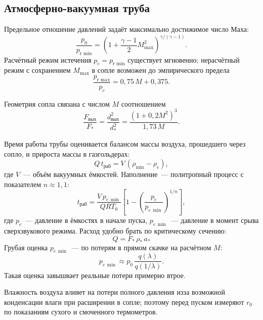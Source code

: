 \documentclass[12pt,a4paper]{article}
\begin{document}
\subsection{Атмосферно-вакуумная труба}

 Предельное отношение давлений задаёт
максимально достижимое число Маха:
\begin{equation}
    \frac{p_0}{p_{\text{г min}}}
    =
    \left(1 + \frac{\gamma-1}{2} M_{\max}^2\right)^{\gamma/(\gamma-1)}.
\end{equation}
Расчётный режим истечения $p_c = p_{\text{г min}}$ существует
мгновенно; нерасчётный режим с сохранением $M_{\max}$ в сопле возможен
до эмпирического предела
\begin{equation}
    \frac{p_{\text{г max}}}{p_c} = 0{,}75\,M + 0{,}375.
\end{equation}

Геометрия сопла связана с числом $M$ соотношением
\begin{equation}
    \frac{F_{\text{вых}}}{F_*}
    =
    \frac{d_{\text{вых}}^2}{d_*^2}
    =
    \frac{(1 + 0{,}2 M^2)^3}{1{,}73\,M}.
\end{equation}

Время работы трубы оценивается балансом массы воздуха, прошедшего через
сопло, и прироста массы в газгольдерах:
\begin{equation}
    Q\, t_{\text{раб}} = V\,(\rho_{\min} - \rho_e),
    \label{eq:mass}
\end{equation}
где $V$~--- объём вакуумных ёмкостей. Наполнение~--- политропный процесс
с показателем $n \approx 1{,}1$:
\begin{equation}
    t_{\text{раб}}
    =
    \frac{V\, p_{e\,\min}}{Q R T_0}
    \left[
      1 - \left(\frac{p_e}{p_{e\,\min}}\right)^{1/n}
    \right],
    \label{eq:twork}
\end{equation}
где $p_e$~--- давление в ёмкостях в начале пуска,
$p_{e\,\min}$~--- давление в момент срыва сверхзвукового режима.
Расход удобно брать по критическому сечению:
\begin{equation}
    Q = F_*\,\rho_*\,a_*
    \label{eq:Q}
\end{equation}
Грубая оценка $p_{e\,\min}$~--- по потерям в прямом скачке на расчётном
$M$:
\begin{equation}
    p_{e\,\min} \approx p_0\,\frac{q(\lambda)}{q(1/\lambda)}.
\end{equation}
Такая оценка завышвает реальные потери примерно втрое.

Влажность воздуха влияет на потери полного давления из\-за возможной
конденсации влаги при расширении в сопле; поэтому перед пуском измеряют
$r_0$ по показаниям сухого и смоченного термометров.
\end{document}
